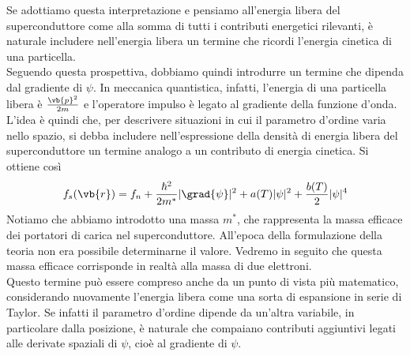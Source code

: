Se adottiamo questa interpretazione e pensiamo all'energia libera del superconduttore come alla somma di tutti i contributi energetici rilevanti, è naturale includere nell'energia libera un termine che ricordi l'energia cinetica di una particella.\\
Seguendo questa prospettiva, dobbiamo quindi introdurre un termine che dipenda dal gradiente di $\psi$. In meccanica quantistica, infatti, l'energia di una particella libera è $\frac{\vb{p}^2}{2m}$ e l'operatore impulso è legato al gradiente della funzione d'onda.\\
L'idea è quindi che, per descrivere situazioni in cui il parametro d'ordine varia nello spazio, si debba includere nell'espressione della densità di energia libera del superconduttore un termine analogo a un contributo di energia cinetica. Si ottiene così
\begin{equation}
   f_s(\vb{r})
   = f_n
   + \frac{\hbar^2}{2m^*} |\grad{\psi}|^2
   + a(T) |\psi|^2
   + \frac{b(T)}{2} |\psi|^4
   \label{eq:free_energy_ginzburg_landau_inhomogeneous}
\end{equation}
Notiamo che abbiamo introdotto una massa $m^*$, che rappresenta la massa efficace dei portatori di carica nel superconduttore. All'epoca della formulazione della teoria non era possibile determinarne il valore. Vedremo in seguito che questa massa efficace corrisponde in realtà alla massa di due elettroni.\\
Questo termine può essere compreso anche da un punto di vista più matematico, considerando nuovamente l'energia libera come una sorta di espansione in serie di Taylor. Se infatti il parametro d'ordine dipende da un'altra variabile, in particolare dalla posizione, è naturale che compaiano contributi aggiuntivi legati alle derivate spaziali di $\psi$, cioè al gradiente di $\psi$.
